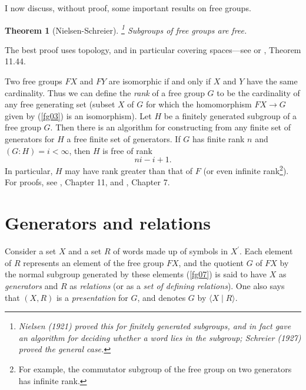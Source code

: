 \documentclass[a4paper,11pt,final]{memoir}%
\newtheorem{theorem}[X]{Theorem}
\theoremstyle{nonumberplain}
\begin{document}
I now discuss, without proof, some important results on free groups.

\begin{theorem}
[Nielsen-Schreier]\label{fg06} \footnote{Nielsen (1921) proved this for
finitely generated subgroups, and in fact gave an algorithm for deciding
whether a word lies in the subgroup; Schreier (1927) proved the general
case.}
%
Subgroups of free groups are free.
\end{theorem}

The best proof uses topology, and in particular covering spaces---see
\cite{serre1980} or \cite{rotman1995}, Theorem 11.44.

Two free groups $FX$ and $FY$ are isomorphic if and only if $X$ and $Y$ have
the same cardinality. Thus we can define the \emph{rank}%
%
\emph{\/} of a free group $G$ to be the cardinality of any free generating set
(subset $X$ of $G$ for which the homomorphism $FX\rightarrow G$ given by
(\ref{fg03}) is an isomorphism). Let $H$ be a finitely generated subgroup of a
free group $G$. Then there is an algorithm for constructing from any finite
set of generators for $H$ a free finite set of generators. If $G$ has finite
rank $n$ and $(G:H)=i<\infty$, then $H$ is free of rank
\[
ni-i+1.
\]
In particular, $H$ may have rank greater than that of $F$ (or even infinite
rank\footnote{For example, the commutator subgroup of the free group on two
generators has infinite rank.}). For proofs, see \cite{rotman1995}, Chapter
11, and \cite{hall1959}, Chapter 7.

\section{Generators and relations}

Consider a set $X$ and a set $R$ of words made up of symbols in $X^{\prime}$.
Each element of $R$ represents an element of the free group $FX$, and the
quotient $G$ of $FX$ by the normal subgroup generated by these elements
(\ref{fg07}) is said to have $X$ as \emph{generators\/}%
and $R$ as \emph{relations }(or as a \emph{set of defining relations}).%
%
One also says that $(X,R)$ is a \emph{presentation\/}%
for $G$, and denotes $G$ by $\langle X\mid R\rangle$.
\end{document}
